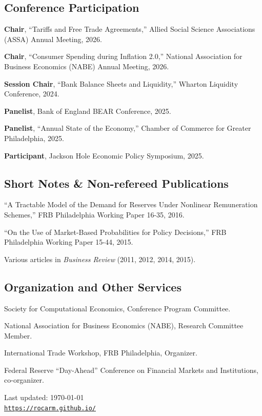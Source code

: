 \documentclass[letterpaper, 12pt]{article}
\def\footerlink{https://rocarm.github.io/}
\renewenvironment{itemize}{
  \begin{list}{}{
    \setlength{\leftmargin}{2em}
  }
}{
  \end{list}
}
\begin{document}
\subsection*{Conference Participation}
\begin{itemize}
  \item \textbf{Chair}, ``Tariffs and Free Trade Agreements,'' Allied Social Science Associations (ASSA) Annual Meeting, 2026.
  \item \textbf{Chair}, ``Consumer Spending during Inflation 2.0,'' National Association for Business Economics (NABE) Annual Meeting, 2026.
  \item \textbf{Session Chair}, ``Bank Balance Sheets and Liquidity,'' Wharton Liquidity Conference, 2024.
  \item \textbf{Panelist}, Bank of England BEAR Conference, 2025.
  \item \textbf{Panelist}, ``Annual State of the Economy,'' Chamber of Commerce for Greater Philadelphia, 2025.
  \item \textbf{Participant}, Jackson Hole Economic Policy Symposium, 2025.  
\end{itemize}

\subsection*{Short Notes \& Non-refereed Publications}
\begin{itemize}
  \item ``A Tractable Model of the Demand for Reserves Under Nonlinear Remuneration Schemes,'' FRB Philadelphia Working Paper 16-35, 2016. 
  \item ``On the Use of Market-Based Probabilities for Policy Decisions,'' FRB Philadelphia Working Paper 15-44, 2015.
  \item Various articles in \textit{Business Review} (2011, 2012, 2014, 2015).
\end{itemize}

\subsection*{Organization and Other Services}

\begin{itemize}
  \item Society for Computational Economics, Conference Program Committee.
  \item National Association for Business Economics (NABE), Research Committee Member.
  \item International Trade Workshop, FRB Philadelphia, Organizer.
  \item Federal Reserve ``Day-Ahead'' Conference on Financial Markets and Institutions, co-organizer.
\end{itemize}

\bigskip

\begin{center}
  \begin{footnotesize}
    Last updated: \today \\
    \href{\footerlink}{\texttt{\footerlink}}
  \end{footnotesize}
\end{center}
\end{document}
